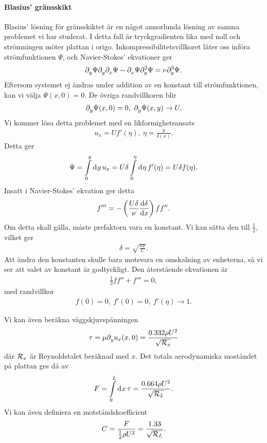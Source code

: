 \paragraph{Blasius' gränsskikt}
Blasius' lösning för gränsskiktet är en något annorlunda lösning av samma problemet vi har studerat. I detta fall är tryckgradienten lika med noll och strömningen möter plattan i origo. Inkompressibilitetsvillkoret låter oss införa strömfunktionen $\Psi$, och Navier-Stokes' ekvationer ger
\begin{align*}
	\del{y}{\Psi}\del{y}{\del{x}{\Psi}} - \del{x}{\Psi}\del[2]{y}{\Psi} = \nu\del[3]{y}{\Psi}.
\end{align*}
Eftersom systemet ej ändras under addition av en konstant till strömfunktionen, kan vi välja $\Psi(x, 0) = 0$. De övriga randvillkoren blir
\begin{align*}
	\del{y}{\Psi}(x, 0) = 0,\ \del{y}{\Psi}(x, y) \to U.
\end{align*}
Vi kommer lösa detta problemet med en likformighetsansats
\begin{align*}
	u_{x} = Uf'(\eta),\ \eta = \frac{y}{\delta(x)}.
\end{align*}
Detta ger
\begin{align*}
	\Psi = \integ{0}{y}{y}{u_{x}} = U\delta\integ{0}{\eta}{\eta}{f'(\eta)} = U\delta f(\eta).
\end{align*}
Insatt i Navier-Stokes' ekvation ger detta
\begin{align*}
	f''' = -\left(\frac{U\delta}{\nu}\dv{\delta}{x}\right)ff''.
\end{align*}
Om detta skall gälla, måste prefaktorn vara en konstant. Vi kan sätta den till $\frac{1}{2}$, vilket ger
\begin{align*}
	\delta = \sqrt{\frac{\nu x}{U}}.
\end{align*}
Att ändra den konstanten skulle bara motsvara en omskalning av enheterna, så vi ser att valet av konstant är godtyckligt. Den återstående ekvationen är
\begin{align*}
	\frac{1}{2}ff'' + f''' = 0,
\end{align*}
med randvillkor
\begin{align*}
	f(0) = 0,\ f'(0) = 0,\ f'(\eta) \to 1.
\end{align*}

Vi kan även beräkna väggskjuvspänningen
\begin{align*}
	\tau = \mu\del{y}{u_{x}}(x, 0) = \frac{0.332\rho U^{2}}{\sqrt{\rey_{x}}}
\end{align*}
där $\rey_{x}$ är Reynoldstalet beräknad med $x$. Det totala aerodynamiska moståndet på plattan ges då av
\begin{align*}
	F = \integ{0}{L}{x}{\tau} = \frac{0.664\rho U^{2}}{\sqrt{\rey_{L}}}.
\end{align*}
Vi kan även definiera en motståndskoefficient
\begin{align*}
	C = \frac{F}{\frac{1}{2}\rho U^{2}} = \frac{1.33}{\sqrt{\rey_{L}}}.
\end{align*}

